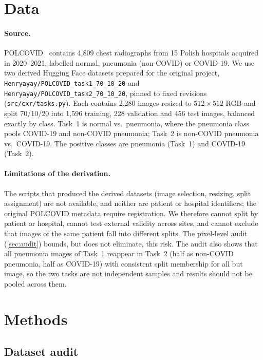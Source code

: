 \documentclass[11pt]{article}
\begin{document}
\section{Data}\label{sec:data}

\paragraph{Source.} POLCOVID~\citep{suwalska2023polcovid} contains 4,809 chest radiographs from
15 Polish hospitals acquired in 2020--2021, labelled normal, pneumonia (non-COVID) or COVID-19.
We use two derived Hugging Face datasets prepared for the original project,
\texttt{Henryayay/POLCOVID\_task1\_70\_10\_20} and \texttt{Henryayay/POLCOVID\_task2\_70\_10\_20},
pinned to fixed revisions (\texttt{src/cxr/tasks.py}). Each contains 2,280 images resized to
$512\times512$ RGB and split 70/10/20 into 1,596 training, 228 validation and 456 test images,
balanced exactly by class. Task~1 is normal vs.\ pneumonia, where the pneumonia class pools
COVID-19 and non-COVID pneumonia; Task~2 is non-COVID pneumonia vs.\ COVID-19. The positive
classes are pneumonia (Task~1) and COVID-19 (Task~2).

\paragraph{Limitations of the derivation.} The scripts that produced the derived datasets
(image selection, resizing, split assignment) are not available, and neither are patient or
hospital identifiers; the original POLCOVID metadata require registration. We therefore cannot
split by patient or hospital, cannot test external validity across sites, and cannot exclude
that images of the same patient fall into different splits. The pixel-level audit
(\cref{sec:audit}) bounds, but does not eliminate, this risk. The audit also shows that all
\CrossTaskShared{} pneumonia images of Task~1 reappear in Task~2 (half as non-COVID pneumonia,
half as COVID-19) with consistent split membership for all but \CrossTaskSplitMismatch{} image,
so the two tasks are not independent samples and results should not be pooled across them.

\section{Methods}\label{sec:methods}

\subsection{Dataset audit}\label{sec:audit-methods}
\end{document}
